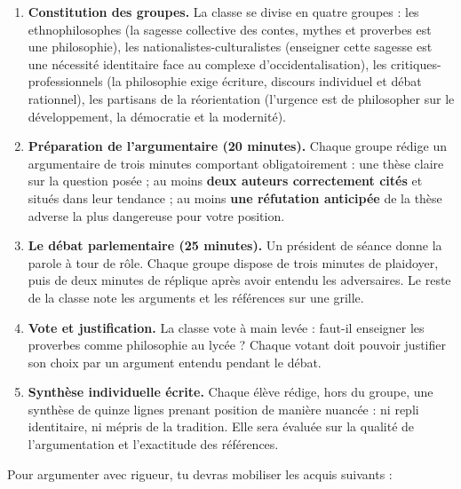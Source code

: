 \documentclass[11pt]{article}
\newcommand{\cle}[1]{{\popxbold\color{popdark}#1}}
\newcounter{popsec}
\newcounter{popsub}
\newcommand{\courssub}[1]{%
  \stepcounter{popsub}%
  \par\vspace{9pt}\noindent{\popxbold\fontsize{11.5}{13}\selectfont\color{popink}{\color{poporange}\thepopsec.\thepopsub}\hspace{6pt}#1}\par\nopagebreak\vspace{4pt}
}
\begin{document}
\begin{enumerate}
\item \textbf{Constitution des groupes.} La classe se divise en quatre groupes : les \cle{ethnophilosophes} (la sagesse collective des contes, mythes et proverbes est une philosophie), les \cle{nationalistes-culturalistes} (enseigner cette sagesse est une nécessité identitaire face au complexe d'occidentalisation), les \cle{critiques-professionnels} (la philosophie exige écriture, discours individuel et débat rationnel), les partisans de la \cle{réorientation} (l'urgence est de philosopher sur le développement, la démocratie et la modernité).

\item \textbf{Préparation de l'argumentaire (20 minutes).} Chaque groupe rédige un argumentaire de trois minutes comportant obligatoirement : une thèse claire sur la question posée ; au moins \textbf{deux auteurs correctement cités} et situés dans leur tendance ; au moins \textbf{une réfutation anticipée} de la thèse adverse la plus dangereuse pour votre position.

\item \textbf{Le débat parlementaire (25 minutes).} Un président de séance donne la parole à tour de rôle. Chaque groupe dispose de trois minutes de plaidoyer, puis de deux minutes de réplique après avoir entendu les adversaires. Le reste de la classe note les arguments et les références sur une grille.

\item \textbf{Vote et justification.} La classe vote à main levée : faut-il enseigner les proverbes comme philosophie au lycée ? Chaque votant doit pouvoir justifier son choix par un argument entendu pendant le débat.

\item \textbf{Synthèse individuelle écrite.} Chaque élève rédige, hors du groupe, une synthèse de quinze lignes prenant position de manière nuancée : ni repli identitaire, ni mépris de la tradition. Elle sera évaluée sur la qualité de l'argumentation et l'exactitude des références.
\end{enumerate}

\courssub{Ressources à mobiliser}

Pour argumenter avec rigueur, tu devras mobiliser les acquis suivants :
\end{document}
